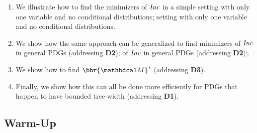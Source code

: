 \documentclass[twoside]{article}
\begin{document}
\begin{enumerate}[itemsep=0pt]
\item
  We
    illustrate how to find the minimizers of $\mathit{Inc}$ in a simple 
    setting with only one variable and no conditional distributions;
    setting with only one variable and no conditional distributions.

  \item
    We
    show how the same approach can be generalized to find minimizers 
    of $\mathit{Inc}$ in general PDGs (addressing \textbf{D2});
    of $\mathit{Inc}$ in general PDGs (addressing \textbf{D2});.
    \item \label{item:+idef}
      We       show how to find $\bbr{\dg M}^*$ (addressing \textbf{D3}).
    \item 
            Finally, we show how this can all be done
                        more efficiently for PDGs that happen to have
    bounded tree-width (addressing \textbf{D1}).
\end{enumerate}

\subsection{Warm-Up}\label{sec:illust}
\end{document}
